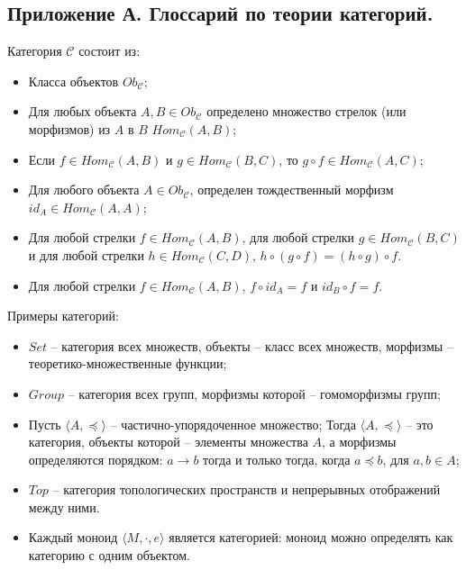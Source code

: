 \subsection{Приложение А. Глоссарий по теории категорий.}

\begin{defin}

  Категория $\mathcal{C}$ состоит из:
  \begin{itemize}
    \item Класса объектов $Ob_{\mathcal{C}}$;
    \item Для любых объекта $A, B \in Ob_{\mathcal{C}}$ определено множество стрелок (или морфизмов) из $A$ в $B$ $Hom_{\mathcal{C}}(A, B)$;
    \item Если $f \in Hom_{\mathcal{C}}(A, B)$ и $g \in Hom_{\mathcal{C}}(B,C)$, то $g \circ f \in Hom_{\mathcal{C}}(A, C)$;
    \item Для любого объекта $A \in Ob_{\mathcal{C}}$, определен тождественный морфизм $id_A \in Hom_{\mathcal{C}}(A, A)$;
    \item Для любой стрелки $f \in Hom_{\mathcal{C}}(A, B)$, для любой стрелки $g \in Hom_{\mathcal{C}}(B,C)$ и для любой стрелки $h \in Hom_{\mathcal{C}}(C,D)$, $h \circ (g \circ f) = (h \circ g) \circ f$.
    \item Для любой стрелки $f \in Hom_{\mathcal{C}}(A, B)$, $f \circ id_A = f$ и $id_B \circ f = f$.
  \end{itemize}
\end{defin}


Примеры категорий:
\begin{itemize}
  \item $Set$ -- категория всех множеств, объекты -- класс всех множеств, морфизмы -- теоретико-множественные функции;
  \item $Group$ -- категория всех групп, морфизмы которой -- гомоморфизмы групп;
  \item Пусть $\langle A, \preceq \rangle$ -- частично-упорядоченное множество;
Тогда $\langle A, \preceq \rangle$ -- это категория, объекты которой -- элементы множества $A$, а морфизмы определяются порядком: $a \rightarrow b$ тогда и только тогда, когда $a \preceq b$, для $a, b \in A$;
  \item $Top$ -- категория топологических пространств и непрерывных отображений между ними.
  \item Каждый моноид $\langle M, \cdot, e \rangle$ является категорией: моноид можно определять как категорию с одним объектом.
\end{itemize}

